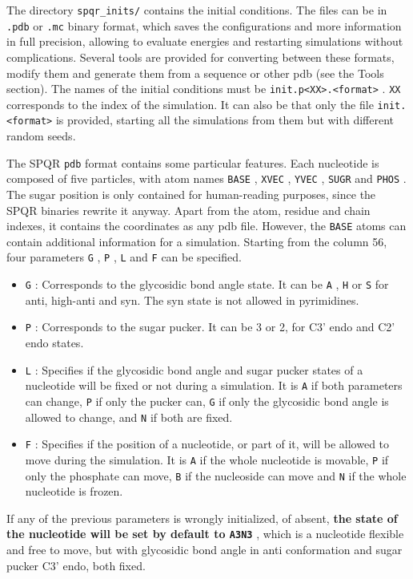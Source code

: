 \documentclass{article}
\begin{document}
The directory \texttt{spqr\_inits/}  contains the initial conditions. The files can be in \texttt{.pdb}  or \texttt{.mc}  binary format, which saves the configurations and more information in full precision, allowing to evaluate energies and restarting simulations without complications. Several tools are provided for converting between these formats, modify them and generate them from a sequence or other pdb (see the Tools section). The names of the initial conditions must be \texttt{init.p<XX>.<format>} . \texttt{XX} corresponds to the index of the simulation. It can also be that only the file \texttt{init.<format>}  is provided, starting all the simulations from them but with different random seeds.

The SPQR \texttt{pdb} format contains some particular features. Each nucleotide is composed of five particles, with atom names \texttt{BASE} , \texttt{XVEC} , \texttt{YVEC} , \texttt{SUGR} and \texttt{PHOS} . The sugar position is only contained for human-reading purposes, since the SPQR binaries rewrite it anyway. Apart from the atom, residue and chain indexes, it contains the coordinates as any pdb file. However, the \texttt{BASE} atoms can contain additional information for a simulation. Starting from the column 56, four parameters \texttt G , \texttt P , \texttt L and \texttt F can be specified.
\begin{itemize}
  \item \texttt G : Corresponds to the glycosidic bond angle state. It can be \texttt A , \texttt H  or \texttt S   for anti, high-anti and syn. The syn state is not allowed in pyrimidines.
  \item \texttt P : Corresponds to the sugar pucker. It can be 3 or 2, for C3' endo and C2' endo states.
  \item \texttt L : Specifies if the glycosidic bond angle and sugar pucker states of a nucleotide will be fixed or not during a simulation. It is \texttt A if both parameters can change, \texttt P if only the pucker can, \texttt G if only the glycosidic bond angle is allowed to change, and \texttt N if both are fixed.
  \item \texttt F : Specifies if the position of a nucleotide, or part of it, will be allowed to move during the simulation. It is \texttt A  if the whole nucleotide is movable, \texttt P  if only the phosphate can move, \texttt B  if the nucleoside can move and \texttt N  if the whole nucleotide is frozen.
  
\end{itemize}
If any of the previous parameters is wrongly initialized, of absent, {\bf the state of the nucleotide will be set by default to \texttt{A3N3} }, which is a nucleotide flexible and free to move, but with glycosidic bond angle in anti conformation and sugar pucker C3' endo, both fixed.
\end{document}
